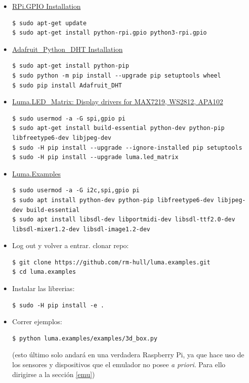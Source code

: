 \begin{itemize}
\itemsep1pt\parskip0pt
\item
  \href{https://sourceforge.net/p/raspberry-gpio-python/wiki/install/}{RPi.GPIO Installation}
  
\begin{Verbatim}[breaklines=true, breakanywhere=true]
$ sudo apt-get update
$ sudo apt-get install python-rpi.gpio python3-rpi.gpio
\end{Verbatim}
\item
  \href{https://github.com/adafruit/Adafruit_Python_DHT\#installing}{Adafruit\_Python\_DHT Installation}
  \begin{Verbatim}[breaklines=true, breakanywhere=true]
$ sudo apt-get install python-pip
$ sudo python -m pip install --upgrade pip setuptools wheel
$ sudo pip install Adafruit_DHT
  \end{Verbatim}
  
\item
  \href{https://luma-led-matrix.readthedocs.io/en/latest/install.html}{Luma.LED\_Matrix: Display drivers for MAX7219, WS2812, APA102}
  \begin{Verbatim}[breaklines=true, breakanywhere=true]
$ sudo usermod -a -G spi,gpio pi
$ sudo apt-get install build-essential python-dev python-pip libfreetype6-dev libjpeg-dev
$ sudo -H pip install --upgrade --ignore-installed pip setuptools
$ sudo -H pip install --upgrade luma.led_matrix
  \end{Verbatim}

\item
  \href{https://github.com/rm-hull/luma.examples\#installation-instructions}{Luma.Examples}
  \begin{Verbatim}[breaklines=true, breakanywhere=true]
$ sudo usermod -a -G i2c,spi,gpio pi
$ sudo apt install python-dev python-pip libfreetype6-dev libjpeg-dev build-essential
$ sudo apt install libsdl-dev libportmidi-dev libsdl-ttf2.0-dev libsdl-mixer1.2-dev libsdl-image1.2-dev
  \end{Verbatim}

\item Log out y volver a entrar. clonar repo:
\begin{Verbatim}[breaklines=true, breakanywhere=true]
$ git clone https://github.com/rm-hull/luma.examples.git
$ cd luma.examples
  \end{Verbatim}

\item Instalar las librerias:
  \begin{Verbatim}[breaklines=true, breakanywhere=true]
$ sudo -H pip install -e .
  \end{Verbatim}

\item{Correr ejemplos:}
\begin{Verbatim}[breaklines=true, breakanywhere=true]
$ python luma.examples/examples/3d_box.py
  \end{Verbatim}
 
(esto último solo andará en
una verdadera Raspberry Pi, ya que hace uso de los sensores y
dispositivos que el emulador no posee \emph{a priori}. Para ello
dirigirse a la sección \ref{emu})


\end{itemize}
